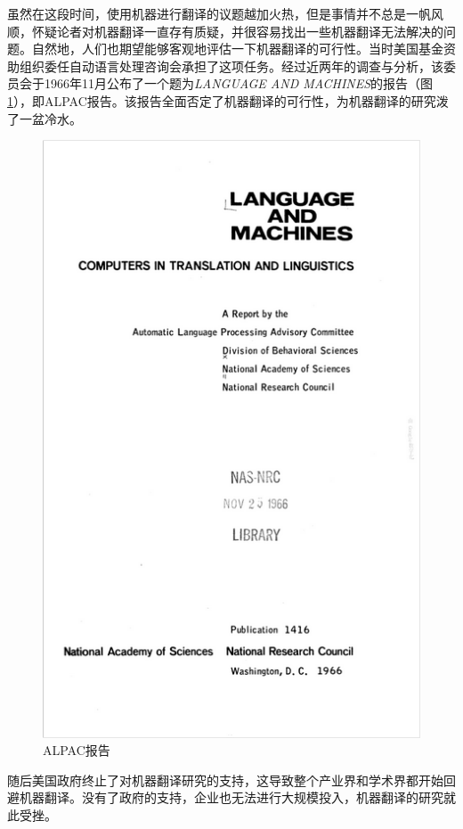 \parinterval 虽然在这段时间，使用机器进行翻译的议题越加火热，但是事情并不总是一帆风顺，怀疑论者对机器翻译一直存有质疑，并很容易找出一些机器翻译无法解决的问题。自然地，人们也期望能够客观地评估一下机器翻译的可行性。当时美国基金资助组织委任自动语言处理咨询会承担了这项任务。经过近两年的调查与分析，该委员会于1966年11月公布了一个题为\emph{LANGUAGE AND MACHINES}的报告（图\ref{fig:1-4}），即ALPAC报告。该报告全面否定了机器翻译的可行性，为机器翻译的研究泼了一盆冷水。

\begin{figure}[htp]
    \centering
\includegraphics[scale=0.65]{./Chapter1/Figures/figure-report.jpg}
    \caption{ALPAC报告}
    \label{fig:1-4}
\end{figure}

\parinterval 随后美国政府终止了对机器翻译研究的支持，这导致整个产业界和学术界都开始回避机器翻译。没有了政府的支持，企业也无法进行大规模投入，机器翻译的研究就此受挫。

